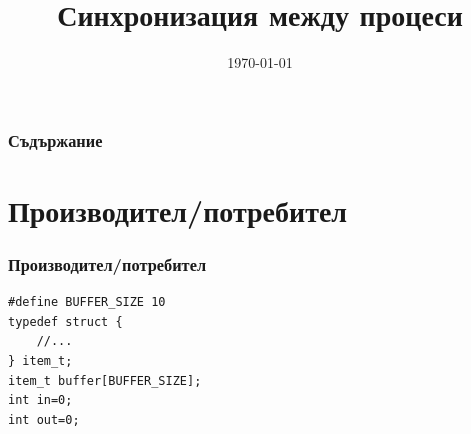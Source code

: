 \documentclass[ignorenonframetext, hyperref=unicode]{beamer}
\title[Синхронизация {(\em\rcsInfoRevision)}]{Синхронизация между процеси}
\date{\today}
\begin{document}
\frame{\maketitle}

\begin{frame}
\frametitle{Съдържание}
\tableofcontents %
\end{frame}

\section{Производител/потребител}

\begin{frame}[containsverbatim]
\frametitle{Производител/потребител}
\begin{lstlisting}
#define BUFFER_SIZE 10
typedef struct {
	//...
} item_t;
item_t buffer[BUFFER_SIZE];
int in=0;
int out=0;
\end{lstlisting}
\end{frame}
\end{document}
